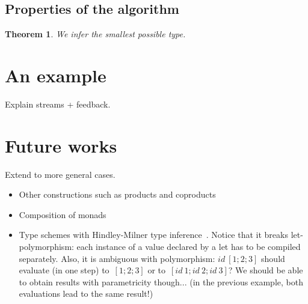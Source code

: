 \documentclass{article}
\newtheorem{theorem}{Theorem}
\begin{document}
\subsection{Properties of the algorithm}
\begin{theorem}
  We infer the smallest possible type.
\end{theorem}

\section{An example}
Explain streams + feedback.

\section{Future works}
Extend to more general cases.
\begin{itemize}
\item Other constructions such as products and coproducts
\item Composition of monads
\item Type schemes with Hindley-Milner type
  inference~\cite{hindley1969principal, damas1982principal}. Notice that it
  breaks let-polymorphism: each instance of a value declared by a let has to be
  compiled separately. Also, it is ambiguous with polymorphism: $id\ [1;2;3]$
  should evaluate (in one step) to~$[1;2;3]$ or to~$[id\ 1;id\ 2;id\ 3]$? We
  should be able to obtain results with parametricity though... (in the previous
  example, both evaluations lead to the same result!)
\end{itemize}



\end{document}
